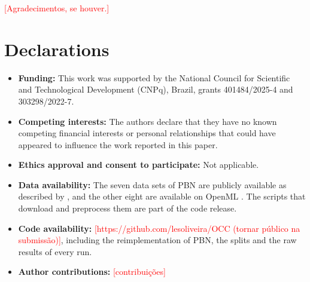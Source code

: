 \documentclass[pdflatex,sn-basic]{sn-jnl}
\newcommand{\todo}[1]{\textcolor{red}{[#1]}}
\begin{document}
\backmatter

\todo{Agradecimentos, se houver.}

\section*{Declarations}

\begin{itemize}
\item \textbf{Funding:} This work was supported by the National Council for Scientific and Technological Development (CNPq), Brazil, grants 401484/2025-4 and 303298/2022-7.
\item \textbf{Competing interests:} The authors declare that they have no known competing financial interests or personal relationships that could have appeared to influence the work reported in this paper.
\item \textbf{Ethics approval and consent to participate:} Not applicable.
\item \textbf{Data availability:} The seven data sets of PBN are publicly available as described by \citet{troisemaine2024pbn}, and the other eight are available on OpenML \citep{vanschoren2013openml}. The scripts that download and preprocess them are part of the code release.
\item \textbf{Code availability:} \todo{https://github.com/lesoliveira/OCC (tornar público na submissão)}, including the reimplementation of PBN, the splits and the raw results of every run.
\item \textbf{Author contributions:} \todo{contribuições}
\end{itemize}
\end{document}

